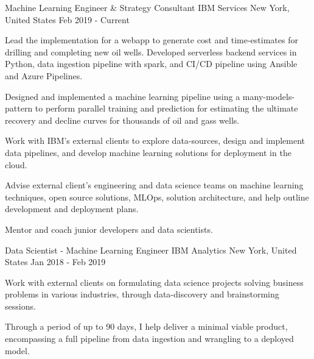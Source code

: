 

\begin{cventries}

  \cventry
    {Machine Learning Engineer \& Strategy Consultant} %
    {IBM Services}
    {New York, United States} %
    {Feb 2019 - Current} %
    {
      \begin{cvitems} %
        \item {Lead the implementation for a webapp to generate cost and time-estimates for drilling and completing new oil wells. Developed serverless backend services in Python, data ingestion pipeline with spark, and CI/CD pipeline using Ansible and Azure Pipelines.}
        \item {Designed and implemented a machine learning pipeline using a many-models-pattern to perform parallel training and prediction for estimating the ultimate recovery and decline curves for thousands of oil and gass wells.}
        \item {Work with IBM's external clients to explore data-sources, design and implement data pipelines, and develop machine learning solutions for deployment in the cloud.}
        \item {Advise external client's engineering and data science teams on machine learning techniques, open source solutions, MLOps, solution architecture, and help outline development and deployment plans.}
        \item {Mentor and coach junior developers and data scientists.}
      \end{cvitems}
    }

  \cventry
    {Data Scientist - Machine Learning Engineer} %
    {IBM Analytics} %
    {New York, United States} %
    {Jan 2018 - Feb 2019} %
    {
      \begin{cvitems} %
        \item {Work with external clients on formulating data science projects solving business problems in various industries, through data-discovery and brainstorming sessions.}
        \item {Through a period of up to 90 days, I help deliver a minimal viable product, encompassing a full pipeline from data ingestion and wrangling to a deployed model.}
      \end{cvitems}
    }


\end{cventries}
